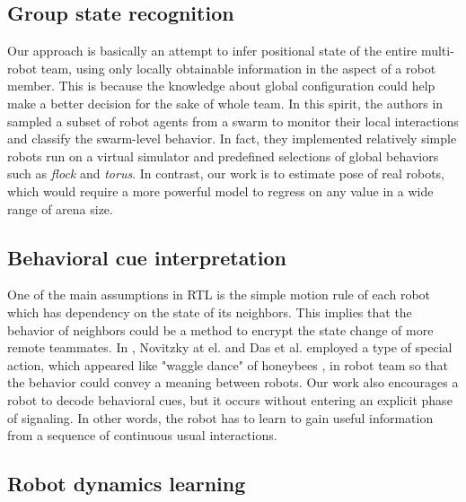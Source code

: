 \documentclass[letterpaper, 10 pt, conference]{ieeeconf}  %
\begin{document}
	\subsection{Group state recognition}
	\label{sec:group_state_recognition}
	Our approach is basically an attempt to infer positional state of the entire 
	multi-robot team, using only locally obtainable information in the aspect of a robot 
	member. This is because the knowledge about global configuration could 
	help make a better decision for the sake of whole team. In this spirit, 
	the authors in \cite{BG14, BSB16} sampled a subset of robot agents from a swarm to 
	monitor their local interactions and classify the swarm-level behavior. 
	In fact, they implemented relatively simple robots run on a virtual simulator and 
	predefined selections of global behaviors such as \emph{flock} and \emph{torus}. 
	In contrast, our work is to estimate pose of real robots, which would require a more 
	powerful model to regress on any value in a wide range of arena size. 

	\subsection{Behavioral cue interpretation}
	\label{sec:behavioral_cue_interpretation}
	
	One of the main assumptions in RTL is the simple motion rule of each robot which 
	has dependency on the state of its neighbors. This implies that the behavior of 
	neighbors could be a method to encrypt the state change of more remote teammates.
	In \cite{NPCBW12, DCV16}, Novitzky at el. and Das et al. employed a type of
	special action, which appeared like "waggle dance" of honeybees \cite{VonFrisch67}, 
	in robot team so that the behavior could convey a meaning between robots. 
	Our work also encourages a robot to decode behavioral cues, but it occurs without 
	entering an explicit phase of signaling. In other words, the robot has to learn 
	to gain useful information from a sequence of continuous usual interactions. 	
	
	\subsection{Robot dynamics learning}
	\label{sec:robot_dynamics_learning}
	
\end{document}
